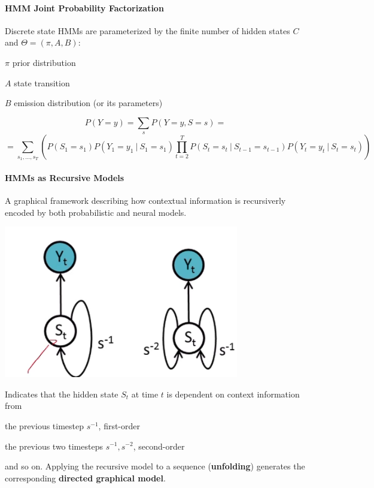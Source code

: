 \documentclass[10pt]{report}
\begin{document}
\paragraph{HMM Joint Probability Factorization} Discrete state HMMs are parameterized by the finite number of hidden states $C$ and $\Theta = (\pi, A, B)$:
\begin{list}{}{}
	\item $\pi$ prior distribution
	\item $A$ state transition
	\item $B$ emission distribution (or its parameters)
\end{list}
$$P(Y = y) = \sum_s P(Y=y,S=s) =$$
$$= \sum_{s_1,\ldots,s_T}\left( P(S_1=s_1)P(Y_1=y_1\:|\:S_1=s_1)\prod_{t=2}^T P(S_t=s_t\:|\:S_{t-1} = s_{t-1})P(Y_t=y_t\:|\:S_t=s_t)\right)$$
\paragraph{HMMs as Recursive Models} A graphical framework describing how contextual information is recursiverly encoded by both probabilistic and neural models.
\begin{center}
	\includegraphics[scale=0.5]{28.png}
\end{center}
Indicates that the hidden state $S_t$ at time $t$ is dependent on context information from
\begin{list}{}{}
	\item the previous timestep $s^{-1}$, first-order
	\item the previous two timesteps $s^{-1},s^{-2}$, second-order
\end{list}
and so on. Applying the recursive model to a sequence (\textbf{unfolding}) generates the corresponding \textbf{directed graphical model}.
\end{document}
